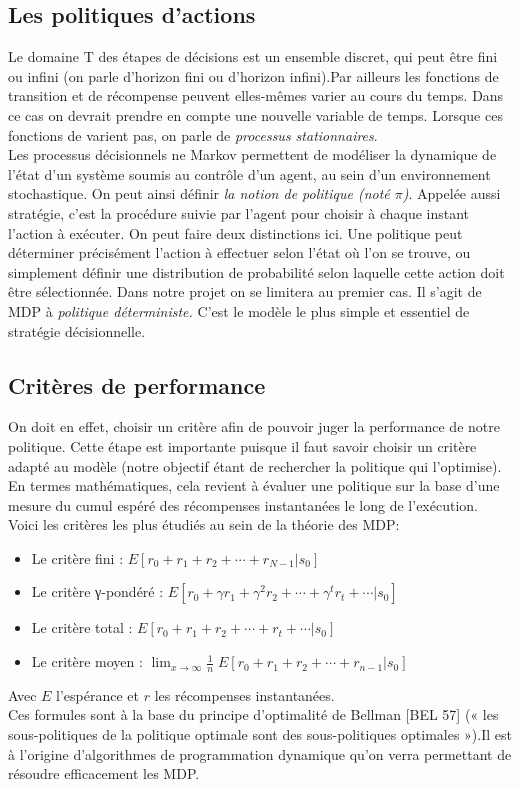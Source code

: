 \documentclass{article}
\begin{document}
\subsection{Les politiques d’actions}
\noindent Le domaine T des étapes de décisions est un ensemble discret, qui peut être fini ou infini (on parle d’horizon fini ou d’horizon infini).Par ailleurs les fonctions de transition et de récompense peuvent elles-mêmes varier au cours du temps. Dans ce cas on devrait prendre en compte une nouvelle variable de temps. Lorsque ces fonctions de varient pas, on parle de \textit{processus stationnaires}.\\
Les processus décisionnels ne Markov permettent de modéliser la dynamique de l’état d’un système soumis au contrôle d’un agent, au sein d’un environnement stochastique. On peut ainsi définir \textit{ la notion de politique (noté $ \pi $)}. Appelée aussi stratégie, c'est la procédure suivie par l’agent pour choisir à chaque instant l’action à exécuter. On peut faire deux distinctions ici. Une politique peut déterminer précisément l’action à effectuer selon l'état où l'on se trouve, ou simplement définir une distribution de probabilité selon laquelle cette action doit être sélectionnée. Dans notre projet on se limitera au premier cas. Il s'agit de MDP à \textit{politique déterministe.} C'est le modèle le plus simple et essentiel de stratégie décisionnelle.

\subsection{Critères de performance}

On doit en effet, choisir un critère afin de pouvoir juger la performance de notre politique. Cette étape est importante puisque il faut savoir choisir un critère adapté au modèle (notre objectif étant de rechercher la politique qui l'optimise). En termes mathématiques, cela revient à évaluer une politique sur la base d’une mesure du cumul espéré des récompenses instantanées le long de l'exécution. Voici les critères les plus étudiés au sein de la théorie des MDP:\\
\begin{itemize}
    \item Le critère fini : $ E[r_0 + r_1 + r_2 + \cdots + r_{N-1} | s_0] $
    \item Le critère γ-pondéré : $ E[r_0 + \gamma r_1 + \gamma^2r_2 + \cdots + \gamma^tr_t + \cdots | s_0] $
    \item Le critère total : $ E[r_0 + r_1 + r_2 +\cdots+ r_t + \cdots | s_0] $
    \item Le critère moyen : $ \lim_{x\to\infty} \frac{1}{n} \;E[r_0 + r_1 + r_2 +\cdots + r_{n−1} | s_0] $ \\
\end{itemize}
Avec $E$ l'espérance et $r$ les récompenses instantanées.\\
Ces formules sont à la base du principe d’optimalité de Bellman
[BEL 57] (« les sous-politiques de la politique optimale sont des sous-politiques
optimales »).Il est à l'origine d'algorithmes de programmation dynamique qu'on verra permettant de résoudre efficacement les MDP.
\end{document}
